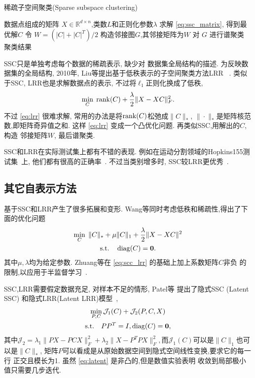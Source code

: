 \begin{algorithm}[tb]
  \caption{稀疏子空间聚类(Sparse subspace clustering)}
  \label{alg:ssc}
  \begin{algorithmic}
    数据点组成的矩阵 \(X\in \mathbb{R}^{d\times
    n}\),类数\(L\)和正则化参数\(\lambda\)
     求解 \eqref{eq:ssc_matrix},   得到最优解\(C\)
     令 \(W=(|C|+|C|^T)/2\) 构造邻接图\(G\),其邻接矩阵为\(W\)
     对 \(G\) 进行谱聚类 
     聚类结果
  \end{algorithmic}
\end{algorithm}

SSC只是单独考虑每个数据的稀疏表示, 缺少对
数据集全局结构的描述. 为反映数据集的全局结构,
2010年, Liu等提出基于低秩表示的子空间聚类方法LRR~\cite{liu2010robust} .
类似于SSC, LRR也是求解数据点的表示,
不过将\(\ell_1\)正则化换成了低秩,
\begin{equation}
  \min_{C} \; \operatorname{rank}(C)+\frac{\lambda}{2}\|X-XC\|_F^2. \label{eq:lrr}
\end{equation}
不过 \eqref{eq:lrr} 很难求解, 常用的办法是将\(\operatorname{rank}(C)\)松弛成\(\|C\|_*\),
\(\|\cdot\|_*\)是矩阵核范数,即矩阵奇异值之和.
这样 \eqref{eq:lrr} 变成一个凸优化问题. 再类似SSC,用解出的\(C\),构造
邻接矩阵\(W\), 最后谱聚类.

SSC和LRR在实际测试集上都有不错的表现.
例如在运动分割领域的Hopkins155测试集~\cite{tron2007benchmark}上,
他们都有很高的正确率~\cite{elhamifar2013sparse, liu2013robust}.
不过当类别增多时, SSC较LRR更优秀~\cite{elhamifar2013sparse}.

\subsection{其它自表示方法}
基于SSC和LRR产生了很多拓展和变形.
Wang等同时考虑低秩和稀疏性,得出了下面的优化问题~\cite{wang2013provable}
\begin{equation}\label{eq:scc_lrr}
  \begin{gathered}
    \min_{C} \; \|C\|_*+\mu \|C\|_1+\frac{\lambda}{2}\|X-XC\|^2 \\
    \text{s.t.}\quad \operatorname{diag}(C) = \mathbf{0}.
  \end{gathered}
\end{equation}
其中\(\mu,\lambda\)均为给定参数. 
Zhuang等在 \eqref{eq:scc_lrr} 的基础上加上系数矩阵\(C\)非负
的限制,以应用于半监督学习~\cite{zhuang2012non}.

SSC,LRR需要假定数据充足, 对样本不足的情形, Patel等
提出了隐式SSC (Latent SSC) 和隐式LRR(Latent LRR)模型~\cite{patel2015latent},
\begin{equation}
  \begin{gathered}
    \min_{P,C} \mathcal{J}_1(C)+\mathcal{J}_2(P, C, X) \\
    \text{s.t.}\quad PP^T=I, \operatorname{diag}(C)=\mathbf{0},
  \end{gathered}
  \label{eq:latent}
\end{equation}
其中\(\mathcal{J}_2=\lambda_1\|PX-PCX\|_F^2+\lambda_2\|X-P^TP
X\|_F^2,\)而\(\mathcal{J}_1(C)\)可以是\(\|C\|_1\)也可以是\(\|C\|_*\),
矩阵\(P\)可以看成是从原始数据空间到隐式空间线性变换,要求它的每一行
正交且模长为1. 虽然 \eqref{eq:latent} 是非凸的,但是数值实验表明
收敛到局部极小值只需要几步迭代.

